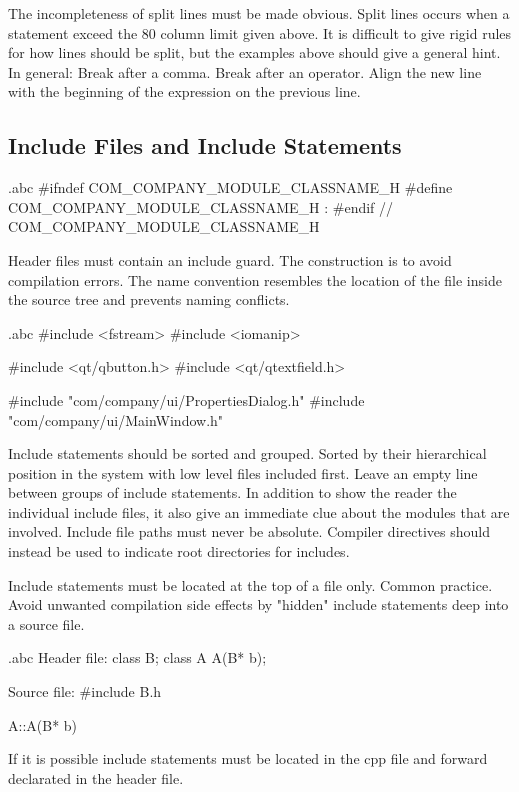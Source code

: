 \recommendation
{The incompleteness of split lines must be made obvious.}
{}
{
	Split lines occurs when a statement exceed the 80 column limit given above. It is difficult to give rigid rules for how lines should be split, but the examples above should give a general hint.\newline
	In general:\newline
	Break after a comma.\newline
	Break after an operator.\newline
	Align the new line with the beginning of the expression on the previous line.
}

\subsection{Include Files and Include Statements}

\begin{filecontents*}{\jobname.abc}
	#ifndef COM_COMPANY_MODULE_CLASSNAME_H
	#define COM_COMPANY_MODULE_CLASSNAME_H
	:
	#endif // COM_COMPANY_MODULE_CLASSNAME_H
\end{filecontents*}

\recommendation
{Header files must contain an include guard.}
{}
{The construction is to avoid compilation errors. The name convention resembles the location of the file inside the source tree and prevents naming conflicts.}


\begin{filecontents*}{\jobname.abc}
	#include <fstream>
	#include <iomanip>
	
	#include <qt/qbutton.h>
	#include <qt/qtextfield.h>
	
	#include "com/company/ui/PropertiesDialog.h"
	#include "com/company/ui/MainWindow.h"
\end{filecontents*}

\recommendation
{Include statements should be sorted and grouped. Sorted by their hierarchical position in the system with low level files included first. Leave an empty line between groups of include statements.}
{}
{
	In addition to show the reader the individual include files, it also give an immediate clue about the modules that are involved.\newline
	Include file paths must never be absolute. Compiler directives should instead be used to indicate root directories for includes.
}

\recommendation
{Include statements must be located at the top of a file only.}
{}
{Common practice. Avoid unwanted compilation side effects by "hidden" include statements deep into a source file.}


\begin{filecontents*}{\jobname.abc}
	Header file:
	class B;
	class A 
	{
	    A(B* b);
	} 
	
	Source file:
	#include B.h
	
	A::A(B* b) {}
\end{filecontents*}

\recommendation
{If it is possible include statements must be located in the cpp file and forward declarated in the header file.}
{}
{}
